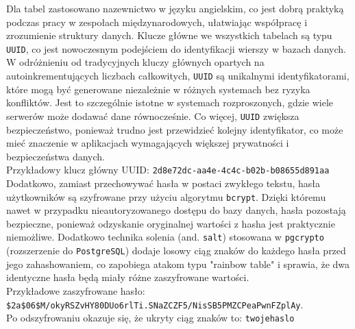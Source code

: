 Dla tabel zastosowano nazewnictwo w języku angielskim, co jest dobrą praktyką podczas pracy w zespołach międzynarodowych, ułatwiając współpracę i zrozumienie struktury danych. Klucze główne we wszystkich tabelach są typu \texttt{UUID}, co jest nowoczesnym podejściem do identyfikacji wierszy w bazach danych. W odróżnieniu od tradycyjnych kluczy głównych opartych na autoinkrementujących liczbach całkowitych, \texttt{UUID} są unikalnymi identyfikatorami, które mogą być generowane niezależnie w różnych systemach bez ryzyka konfliktów. Jest to szczególnie istotne w systemach rozproszonych, gdzie wiele serwerów może dodawać dane równocześnie. Co więcej, \texttt{UUID} zwiększa bezpieczeństwo, ponieważ trudno jest przewidzieć kolejny identyfikator, co może mieć znaczenie w aplikacjach wymagających większej prywatności i bezpieczeństwa danych. \\
Przykładowy klucz główny UUID: \texttt{2d8e72dc-aa4e-4c4c-b02b-b08655d891aa} \\

Dodatkowo, zamiast przechowywać hasła w postaci zwykłego tekstu, hasła użytkowników są szyfrowane przy użyciu algorytmu \texttt{bcrypt}. Dzięki któremu nawet w przypadku nieautoryzowanego dostępu do bazy danych, hasła pozostają bezpieczne, ponieważ odzyskanie oryginalnej wartości z hasha jest praktycznie niemożliwe. Dodatkowo technika solenia (and. \texttt{salt}) stosowana w \texttt{pgcrypto} (rozszerzenie do \texttt{PostgreSQL}) dodaje losowy ciąg znaków do każdego hasła przed jego zahashowaniem, co zapobiega atakom typu "rainbow table" i sprawia, że dwa identyczne hasła będą miały różne zaszyfrowane wartości. \\
Przykładowe zaszyfrowane hasło: \\
\texttt{\$2a\$06\$M/okyRSZvHY80DUo6rlTi.SNaZCZF5/NisSB5PMZCPeaPwnFZplAy}. \\
Po odszyfrowaniu okazuje się, że ukryty ciąg znaków to: \texttt{twojehaslo}

\cite{React} \cite{Next} \cite{Express} \cite{PostgreSQL} \cite{LogistykaMiędzynarodowa} \cite{MurphyWoodLogistyka}
